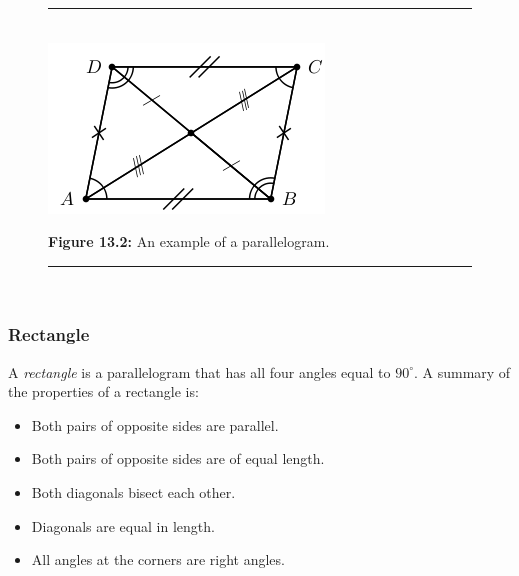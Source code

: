           
    \setcounter{subfigure}{0}


	\begin{figure}[H] %
    \begin{center}
    \rule[.1in]{\figurerulewidth}{.005in} \\
        \label{m39354*uid61!!!underscore!!!media}\label{m39354*uid61!!!underscore!!!printimage}\includegraphics{col11306.imgs/m39354_MG10C13_041.png} %
        
      \vspace{2pt}
    \vspace{\rubberspace}\par \begin{cnxcaption}
	  \small \textbf{Figure 13.2: }An example of a parallelogram.
	\end{cnxcaption}
      
    \vspace{.1in}
    \rule[.1in]{\figurerulewidth}{.005in} \\
        
    \end{center}

 \end{figure}   

    \addtocounter{footnote}{-0}
    
        
        \label{m39354*uid62}
            \subsubsection{ Rectangle}
            \nopagebreak
            
          
          \label{m39354*id318929}A \textsl{rectangle} is a parallelogram that has all four angles equal to \begin{math}{90}^{\circ }\end{math}. A summary of the properties of a rectangle is:\par 
          \label{m39354*id318954}\begin{itemize}[noitemsep]
            \label{m39354*uid63}\item Both pairs of opposite sides are parallel.
\label{m39354*uid64}\item Both pairs of opposite sides are of equal length.
\label{m39354*uid65}\item Both diagonals bisect each other.
\label{m39354*uid66}\item Diagonals are equal in length.
\label{m39354*uid67}\item All angles at the corners are right angles.
\end{itemize}
        
